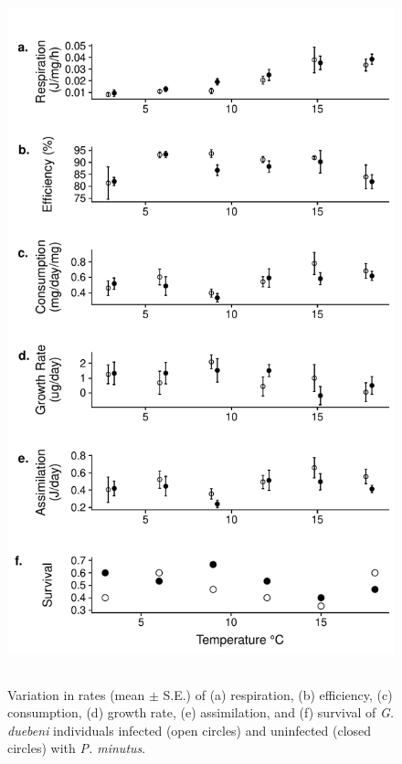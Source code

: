 \begin{figure}[H]
    \centering
    \includegraphics[keepaspectratio, height=8in]{figures/ch2/physio_final.pdf}
  \caption [Impact of temperature and parasites on host physiology]{Variation in rates (mean  $\pm$ S.E.) of (a) respiration, (b) efficiency, (c) consumption, (d) growth rate, (e) assimilation, and (f) survival of \emph{G. duebeni} individuals infected (open circles) and uninfected (closed circles) with \emph{P. minutus}.} 
    \label{fig:physio}
\end{figure}

